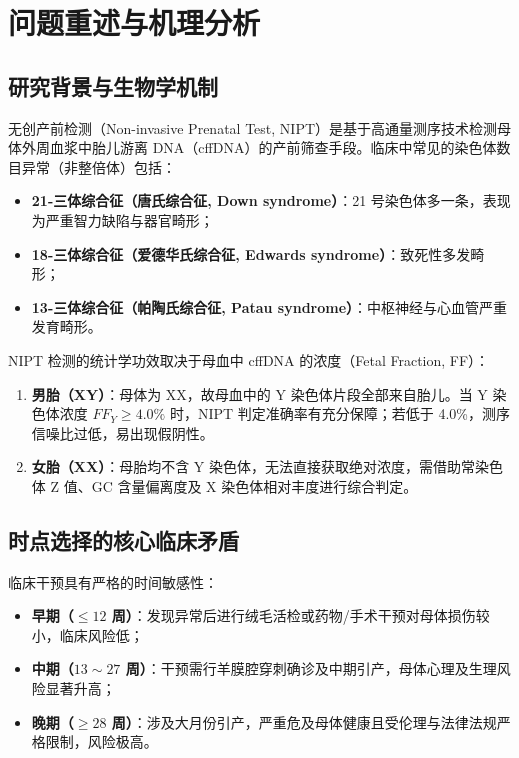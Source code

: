 \documentclass[11pt,a4paper]{article}
\begin{document}
\newpage

\section{问题重述与机理分析}

\subsection{研究背景与生物学机制}
无创产前检测（Non-invasive Prenatal Test, NIPT）是基于高通量测序技术检测母体外周血浆中胎儿游离 DNA（cffDNA）的产前筛查手段。临床中常见的染色体数目异常（非整倍体）包括：
\begin{itemize}[leftmargin=*]
    \item \textbf{21-三体综合征（唐氏综合征, Down syndrome）}：21 号染色体多一条，表现为严重智力缺陷与器官畸形；
    \item \textbf{18-三体综合征（爱德华氏综合征, Edwards syndrome）}：致死性多发畸形；
    \item \textbf{13-三体综合征（帕陶氏综合征, Patau syndrome）}：中枢神经与心血管严重发育畸形。
\end{itemize}

NIPT 检测的统计学功效取决于母血中 cffDNA 的浓度（Fetal Fraction, FF）：
\begin{enumerate}[leftmargin=*]
    \item \textbf{男胎（XY）}：母体为 XX，故母血中的 Y 染色体片段全部来自胎儿。当 Y 染色体浓度 $FF_Y \ge 4.0\%$ 时，NIPT 判定准确率有充分保障；若低于 4.0\%，测序信噪比过低，易出现假阴性。
    \item \textbf{女胎（XX）}：母胎均不含 Y 染色体，无法直接获取绝对浓度，需借助常染色体 Z 值、GC 含量偏离度及 X 染色体相对丰度进行综合判定。
\end{enumerate}

\subsection{时点选择的核心临床矛盾}
临床干预具有严格的时间敏感性：
\begin{itemize}[leftmargin=*]
    \item \textbf{早期（$\le 12$ 周）}：发现异常后进行绒毛活检或药物/手术干预对母体损伤较小，临床风险低；
    \item \textbf{中期（$13 \sim 27$ 周）}：干预需行羊膜腔穿刺确诊及中期引产，母体心理及生理风险显著升高；
    \item \textbf{晚期（$\ge 28$ 周）}：涉及大月份引产，严重危及母体健康且受伦理与法律法规严格限制，风险极高。
\end{itemize}
\end{document}
